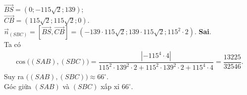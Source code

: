 \begin{ex}
{\begin{itemchoice}
			$\overrightarrow{BS}=\left(0;-115\sqrt{2};139\right)$;\\
			$\overrightarrow{CB}=\left(115\sqrt{2};115\sqrt{2};0\right)$.\\
			$\overrightarrow{n}_{(SBC)}=\left[\overrightarrow{BS},\overrightarrow{CB}\right]=\left(-139\cdot 115\sqrt{2};139\cdot 115\sqrt{2};115^2\cdot 2\right)$.
			\itemch \textbf{Sai}.\\
			Ta có
			\begin{align*}
				\cos\big((SAB),(SBC)\big)=\dfrac{\left|-115^4\cdot 4\right|}{115^2\cdot 139^2\cdot 2+115^2\cdot 139^2\cdot 2+115^4\cdot 4}=\dfrac{13225}{32546}.
			\end{align*}
			Suy ra $\big((SAB),(SBC)\big)\approx 66^\circ$.\\
			Góc giữa $(SAB)$ và $(SBC)$ xấp xỉ $66^\circ$.
		\end{itemchoice}
	}
\end{ex}

